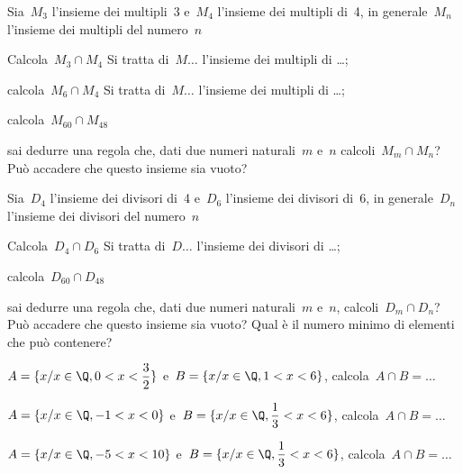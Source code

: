 \begin{esercizio}
\label{ese:7.46}
Sia~\(M_{3}\) l'insieme dei multipli~3 e~\(M_{4}\) l'insieme dei multipli 
di~4, in
generale~\(M_{n}\) l'insieme dei multipli del numero~\(n\)
\vspace{-6pt}
 \begin{enumeratea}
 \item Calcola~\(M_{3}\cap M_{4}\) Si tratta di~\(M\ldots\) l'insieme dei 
multipli 
di \ldots;
 \item calcola~\(M_{6}\cap M_{4}\) Si tratta di~\(M\ldots\) l'insieme dei 
multipli 
di \ldots;
 \item calcola~\(M_{60}\cap M_{48}\)
 \item sai dedurre una regola che, dati due numeri naturali~\(m\) e~\(n\) 
calcoli~\(M_{m}\cap M_{n}\)? Può accadere che questo insieme sia vuoto?
 \end{enumeratea}
\end{esercizio}


\begin{esercizio}
\label{ese:7.47}
Sia~\(D_{4}\) l'insieme dei divisori di~4 e~\(D_{6}\) l'insieme dei divisori 
di~6, 
in generale~\(D_{n}\) l'insieme dei divisori del numero~\(n\)
\vspace{-6pt}
\begin{enumeratea}
 \item Calcola~\(D_{4}\cap D_{6}\) Si tratta di~\(D\ldots\) l'insieme dei 
divisori 
di \ldots;
 \item calcola~\(D_{60}\cap D_{48}\)
 \item sai dedurre una regola che, dati due numeri naturali~\(m\) e~\(n\),
calcoli~\(D_{m}\cap D_{n}\)? Può accadere che questo insieme sia
vuoto? Qual è il numero minimo di elementi che può contenere?
\end{enumeratea}
\end{esercizio}

\begin{esercizio}
\label{ese:7.48}
\(A=\{x/x\in \Q,0<x<\dfrac{3}{2}\}\) e~\(B=\{x/x\in \Q,1<x<6\}\), 
calcola~\(A\cap B=\ldots\)
\end{esercizio}

\begin{esercizio}
\label{ese:7.49}
\(A=\{x/x\in \Q,-1<x<0\}\) e~\(B=\{x/x\in \Q,\dfrac{1}{3}<x<6\}\), 
calcola~\(A\cap B=\ldots\)
\end{esercizio}

\begin{esercizio}
\label{ese:7.50}
\(A=\{x/x\in \Q,-5<x<10\}\) e~\(B=\{x/x\in \Q,\dfrac{1}{3}<x<6\}\), 
calcola~\(A\cap B=\ldots\)
\end{esercizio}

